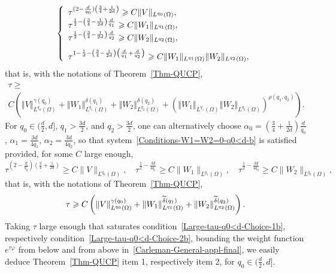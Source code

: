 \documentclass[AHL,Unicode,longabstracts]{cedram}
\newcommand*\ds{\displaystyle}
\newcommand{\norm}[1]{\left\Vert#1\right\Vert}
\renewcommand{\geq}{\geqslant}
\renewcommand{\tilde}{\widetilde}
\let\oldtilde\tilde
\renewcommand*{\tilde}[1]{\mathchoice{\widetilde{#1}}{\widetilde{#1}}{\oldtilde{#1}}{\oldtilde{#1}}}
\begin{document}
\begin{equation}\label{Large-tau-q0<d-Choice-1}
\left\{
\begin{array}{l}
\ds \tau^{(2 - \frac{d}{q_0}) \left(\frac{3}{4}+\frac{1}{2d}\right)} \geq C \|V \|_{L^{q_0}(\Omega)},\\
\ds
\tau^{\frac{1}{2} - \left(\frac{3}{4} - \frac{1}{2d}\right)\frac{d}{q_1}} \geq C \| W_{1} \|_{L^{q_1}(\Omega)},
\\
\tau^{\frac{1}{2} - \left(\frac{3}{4} - \frac{1}{2d}\right)\frac{d}{q_2}} \geq C \| W_{2} \|_{L^{q_2}(\Omega)},
\medskip
\\
\ds \tau^{1-\frac{1}{d} - \left(\frac{3}{4} - \frac{1}{2d}\right) \left(\frac{d}{q_1} + \frac{d}{q_2}\right) } \geq C \| W_{1} \|_{L^{q_1}(\Omega)} \| W_{2} \|_{L^{q_2}(\Omega)},
\end{array}\right.
\end{equation}
that is, with the notations of Theorem~\ref{Thm-QUCP},
\begin{multline}\label{Large-tau-q0<d-Choice-1b}
\tau \geq\\
C \left(\norm{V}_{L^{q_0}(\Omega)}^{\gamma(q_0)}+\norm{W_1}_{L^{q_1}(\Omega)}^{\delta(q_1)} + \norm{W_2}_{L^{q_2}(\Omega)}^{\delta(q_2)} + \left(\norm{W_1}_{L^{q_1}(\Omega)}\norm{W_2}_{L^{q_2}(\Omega)}\right)^{\rho(q_1,q_2)}
\right).
\end{multline}
For $q_0 \in (\frac{d}{2}, d]$, $q_1 > \frac{3d}{2} $, and $q_2 > \frac{3d}{2} $, one can alternatively choose $\alpha_0 = (\frac{3}{4} + \frac{1}{2d})\frac{d}{q_0}$, $\alpha_1 = \frac{3d}{4q_1}$, $\alpha_2 = \frac{3d}{4q_2}$, so that system~\eqref{Conditions-W1=W2=0-q0<d-b} is satisfied provided, for some $C$ large enough,
\begin{equation*}
\ds
\tau^{\left(2 - \frac{d}{q_0}\right) \left(\frac{3}{4}+\frac{1}{2d}\right)} \geq C \|V \|_{L^{q_0}(\Omega)},
\ds
\quad\tau^{\frac{1}{2} - \frac{3d}{4q_1}} \geq C \| W_{1} \|_{L^{q_1}(\Omega)},
\quad
\tau^{\frac{1}{2} - \frac{3d}{4q_2}} \geq C \| W_{2} \|_{L^{q_2}(\Omega)},
\end{equation*}
that is, with the notations of Theorem~\ref{Thm-QUCP},
\begin{equation}\label{Large-tau-q0<d-Choice-2b}
\tau \geq C \left(\norm{V}_{L^{q_0}(\Omega)}^{\gamma(q_0)}+\norm{W_1}_{L^{q_1}(\Omega)}^{\tilde \delta(q_1)} + \norm{W_2}_{L^{q_2}(\Omega)}^{\tilde \delta(q_2)}\right).
\end{equation}
Taking $\tau$ large enough that saturates condition~\eqref{Large-tau-q0<d-Choice-1b}, respectively condition~\eqref{Large-tau-q0<d-Choice-2b}, bounding the weight function $e^{\tau \varphi}$ from below and from above in~\eqref{Carleman-General-appl-final}, we easily deduce Theorem~\ref{Thm-QUCP} item 1, respectively item 2, for $q_0 \in (\frac{d}{2}, d]$.
\end{document}
